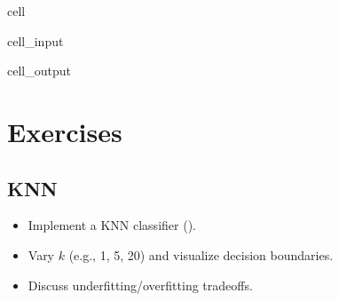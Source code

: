 \documentclass[letterpaper,10pt,english]{jupyterBook}
\begin{document}
\begin{sphinxuseclass}{cell}\begin{sphinxVerbatimInput}

\begin{sphinxuseclass}{cell_input}
\begin{sphinxVerbatim}[commandchars=\\\{\}]
 

   

   
\end{sphinxVerbatim}

\end{sphinxuseclass}\end{sphinxVerbatimInput}
\begin{sphinxVerbatimOutput}

\begin{sphinxuseclass}{cell_output}
\noindent{}

\end{sphinxuseclass}\end{sphinxVerbatimOutput}

\end{sphinxuseclass}

\section{Exercises}
\label{\detokenize{06:id1}}

\subsection{KNN}
\label{\detokenize{06:knn}}\begin{itemize}
\item {} 
\sphinxAtStartPar
Implement a KNN classifier ().

\item {} 
\sphinxAtStartPar
Vary \(k\) (e.g., 1, 5, 20) and visualize decision boundaries.

\item {} 
\sphinxAtStartPar
Discuss underfitting/overfitting trade\sphinxhyphen{}offs.

\end{itemize}
\end{document}
